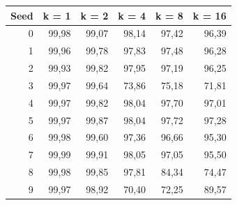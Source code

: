 \begin{tabular}{rrrrrr}
\hline
\textbf{Seed} & \textbf{k = 1} & \textbf{k = 2} & \textbf{k = 4} & \textbf{k = 8} & \textbf{k = 16} \\ \hline
0 & 99,98 & 99,07 & 98,14 & 97,42 & 96,39 \\
1 & 99,96 & 99,78 & 97,83 & 97,48 & 96,28 \\
2 & 99,93 & 99,82 & 97,95 & 97,19 & 96,25 \\
3 & 99,97 & 99,64 & 73,86 & 75,18 & 71,81 \\
4 & 99,97 & 99,82 & 98,04 & 97,70 & 97,01 \\
5 & 99,97 & 99,87 & 98,04 & 97,72 & 97,28 \\
6 & 99,98 & 99,60 & 97,36 & 96,66 & 95,30 \\
7 & 99,99 & 99,91 & 98,05 & 97,05 & 95,50 \\
8 & 99,98 & 99,85 & 97,81 & 84,34 & 74,47 \\
9 & 99,97 & 98,92 & 70,40 & 72,25 & 89,57 \\
\hline
\end{tabular}
